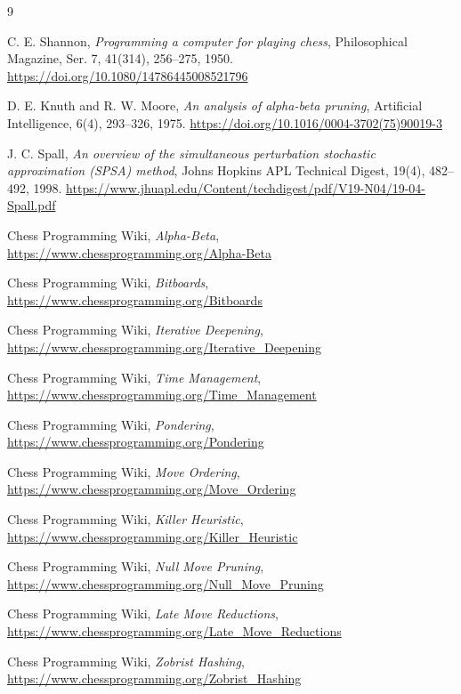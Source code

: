 \documentclass[12pt,a4paper]{article}
\begin{document}
\newpage
\begin{thebibliography}{9}

C. E. Shannon,
\textit{Programming a computer for playing chess},
Philosophical Magazine, Ser. 7, 41(314), 256--275, 1950.
\url{https://doi.org/10.1080/14786445008521796}

D. E. Knuth and R. W. Moore,
\textit{An analysis of alpha-beta pruning},
Artificial Intelligence, 6(4), 293--326, 1975.
\url{https://doi.org/10.1016/0004-3702(75)90019-3}

J. C. Spall,
\textit{An overview of the simultaneous perturbation stochastic approximation (SPSA) method},
Johns Hopkins APL Technical Digest, 19(4), 482--492, 1998.
\url{https://www.jhuapl.edu/Content/techdigest/pdf/V19-N04/19-04-Spall.pdf}

Chess Programming Wiki,
\textit{Alpha-Beta},
\url{https://www.chessprogramming.org/Alpha-Beta}

Chess Programming Wiki,
\textit{Bitboards},
\url{https://www.chessprogramming.org/Bitboards}

Chess Programming Wiki,
\textit{Iterative Deepening},
\url{https://www.chessprogramming.org/Iterative_Deepening}

Chess Programming Wiki,
\textit{Time Management},
\url{https://www.chessprogramming.org/Time_Management}

Chess Programming Wiki,
\textit{Pondering},
\url{https://www.chessprogramming.org/Pondering}

Chess Programming Wiki,
\textit{Move Ordering},
\url{https://www.chessprogramming.org/Move_Ordering}

Chess Programming Wiki,
\textit{Killer Heuristic},
\url{https://www.chessprogramming.org/Killer_Heuristic}

Chess Programming Wiki,
\textit{Null Move Pruning},
\url{https://www.chessprogramming.org/Null_Move_Pruning}

Chess Programming Wiki,
\textit{Late Move Reductions},
\url{https://www.chessprogramming.org/Late_Move_Reductions}

Chess Programming Wiki,
\textit{Zobrist Hashing},
\url{https://www.chessprogramming.org/Zobrist_Hashing}


\end{thebibliography}
\end{document}
